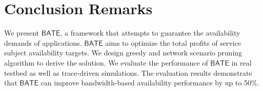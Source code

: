 \documentclass[sigconf]{acmart}
\begin{document}
\section{Conclusion Remarks}
We present $\mathsf{BATE}$, a framework that attempts to guarantee the availability demands of applications.
 $\mathsf{BATE}$ aims to optimize the total profits of service subject availability targets.
We design greedy and network scenario pruning algorithm to derive the solution.
We evaluate the performance of $\mathsf{BATE}$ in real testbed as well as trace-driven simulations.
The evaluation results demonstrate that $\mathsf{BATE}$ can improve  bandwidth-based availability performance by up to 50\%.
\end{document}
